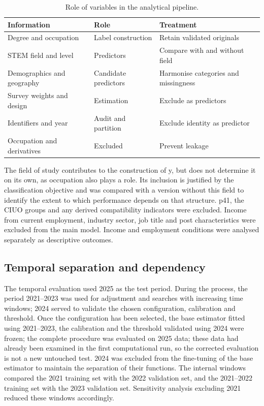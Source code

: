 \begin{table}[htbp]
\caption{Role of variables in the analytical pipeline.\label{tab:variables}}
\small\begin{tabularx}{\linewidth}{p{.30\linewidth}XX}\toprule Information & Role & Treatment \\ \midrule
Degree and occupation & Label construction & Retain validated originals \\
STEM field and level & Predictors & Compare with and without field \\
Demographics and geography & Candidate predictors & Harmonise categories and missingness \\
Survey weights and design & Estimation & Exclude as predictors \\
Identifiers and year & Audit and partition & Exclude identity as predictor \\
Occupation and derivatives & Excluded & Prevent leakage \\\bottomrule\end{tabularx}\end{table}



The field of study contributes to the construction of y, but does not determine it on its own, as occupation also plays a role. Its inclusion is justified by the classification objective and was compared with a version without this field to identify the extent to which performance depends on that structure. p41, the CIUO groups and any derived compatibility indicators were excluded. Income from current employment, industry sector, job title and post characteristics were excluded from the main model. Income and employment conditions were analysed separately as descriptive outcomes.

\subsection{Temporal separation and dependency}



The temporal evaluation used 2025 as the test period. During the process, the period 2021--2023 was used for adjustment and searches with increasing time windows; 2024 served to validate the chosen configuration, calibration and threshold. Once the configuration has been selected, the base estimator fitted using 2021--2023, the calibration and the threshold validated using 2024 were frozen; the complete procedure was evaluated on 2025 data; these data had already been examined in the first computational run, so the corrected evaluation is not a new untouched test. 2024 was excluded from the fine-tuning of the base estimator to maintain the separation of their functions. The internal windows compared the 2021 training set with the 2022 validation set, and the 2021--2022 training set with the 2023 validation set. Sensitivity analysis excluding 2021 reduced these windows accordingly.

